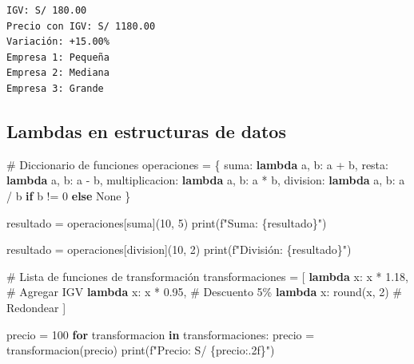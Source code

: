 \documentclass[
  doc,
  floatsintext,
  longtable,
  a4paper,
  nolmodern,
  notxfonts,
  notimes,
  12pt,
  colorlinks=true,linkcolor=blue,citecolor=blue,urlcolor=blue]{apa7}
\newenvironment{Shaded}{\begin{snugshade}}{\end{snugshade}}
\newcommand{\BuiltInTok}[1]{\textcolor[rgb]{0.00,0.23,0.31}{#1}}
\newcommand{\CommentTok}[1]{\textcolor[rgb]{0.37,0.37,0.37}{#1}}
\newcommand{\ControlFlowTok}[1]{\textcolor[rgb]{0.00,0.23,0.31}{\textbf{#1}}}
\newcommand{\DecValTok}[1]{\textcolor[rgb]{0.68,0.00,0.00}{#1}}
\newcommand{\FloatTok}[1]{\textcolor[rgb]{0.68,0.00,0.00}{#1}}
\newcommand{\KeywordTok}[1]{\textcolor[rgb]{0.00,0.23,0.31}{\textbf{#1}}}
\newcommand{\NormalTok}[1]{\textcolor[rgb]{0.00,0.23,0.31}{#1}}
\newcommand{\OperatorTok}[1]{\textcolor[rgb]{0.37,0.37,0.37}{#1}}
\newcommand{\SpecialCharTok}[1]{\textcolor[rgb]{0.37,0.37,0.37}{#1}}
\newcommand{\SpecialStringTok}[1]{\textcolor[rgb]{0.13,0.47,0.30}{#1}}
\newcommand{\StringTok}[1]{\textcolor[rgb]{0.13,0.47,0.30}{#1}}
\newcommand{\VariableTok}[1]{\textcolor[rgb]{0.07,0.07,0.07}{#1}}
\begin{document}
\begin{verbatim}
IGV: S/ 180.00
Precio con IGV: S/ 1180.00
Variación: +15.00%
Empresa 1: Pequeña
Empresa 2: Mediana
Empresa 3: Grande
\end{verbatim}

\subsection{Lambdas en estructuras de
datos}\label{lambdas-en-estructuras-de-datos}

\begin{Shaded}
\begin{Highlighting}[]
\CommentTok{\# Diccionario de funciones}
\NormalTok{operaciones }\OperatorTok{=}\NormalTok{ \{}
    \StringTok{\textquotesingle{}suma\textquotesingle{}}\NormalTok{: }\KeywordTok{lambda}\NormalTok{ a, b: a }\OperatorTok{+}\NormalTok{ b,}
    \StringTok{\textquotesingle{}resta\textquotesingle{}}\NormalTok{: }\KeywordTok{lambda}\NormalTok{ a, b: a }\OperatorTok{{-}}\NormalTok{ b,}
    \StringTok{\textquotesingle{}multiplicacion\textquotesingle{}}\NormalTok{: }\KeywordTok{lambda}\NormalTok{ a, b: a }\OperatorTok{*}\NormalTok{ b,}
    \StringTok{\textquotesingle{}division\textquotesingle{}}\NormalTok{: }\KeywordTok{lambda}\NormalTok{ a, b: a }\OperatorTok{/}\NormalTok{ b }\ControlFlowTok{if}\NormalTok{ b }\OperatorTok{!=} \DecValTok{0} \ControlFlowTok{else} \VariableTok{None}
\NormalTok{\}}

\NormalTok{resultado }\OperatorTok{=}\NormalTok{ operaciones[}\StringTok{\textquotesingle{}suma\textquotesingle{}}\NormalTok{](}\DecValTok{10}\NormalTok{, }\DecValTok{5}\NormalTok{)}
\BuiltInTok{print}\NormalTok{(}\SpecialStringTok{f"Suma: }\SpecialCharTok{\{}\NormalTok{resultado}\SpecialCharTok{\}}\SpecialStringTok{"}\NormalTok{)}

\NormalTok{resultado }\OperatorTok{=}\NormalTok{ operaciones[}\StringTok{\textquotesingle{}division\textquotesingle{}}\NormalTok{](}\DecValTok{10}\NormalTok{, }\DecValTok{2}\NormalTok{)}
\BuiltInTok{print}\NormalTok{(}\SpecialStringTok{f"División: }\SpecialCharTok{\{}\NormalTok{resultado}\SpecialCharTok{\}}\SpecialStringTok{"}\NormalTok{)}

\CommentTok{\# Lista de funciones de transformación}
\NormalTok{transformaciones }\OperatorTok{=}\NormalTok{ [}
    \KeywordTok{lambda}\NormalTok{ x: x }\OperatorTok{*} \FloatTok{1.18}\NormalTok{,  }\CommentTok{\# Agregar IGV}
    \KeywordTok{lambda}\NormalTok{ x: x }\OperatorTok{*} \FloatTok{0.95}\NormalTok{,  }\CommentTok{\# Descuento 5\%}
    \KeywordTok{lambda}\NormalTok{ x: }\BuiltInTok{round}\NormalTok{(x, }\DecValTok{2}\NormalTok{)  }\CommentTok{\# Redondear}
\NormalTok{]}

\NormalTok{precio }\OperatorTok{=} \DecValTok{100}
\ControlFlowTok{for}\NormalTok{ transformacion }\KeywordTok{in}\NormalTok{ transformaciones:}
\NormalTok{    precio }\OperatorTok{=}\NormalTok{ transformacion(precio)}
    \BuiltInTok{print}\NormalTok{(}\SpecialStringTok{f"Precio: S/ }\SpecialCharTok{\{}\NormalTok{precio}\SpecialCharTok{:.2f\}}\SpecialStringTok{"}\NormalTok{)}
\end{Highlighting}
\end{Shaded}
\end{document}

